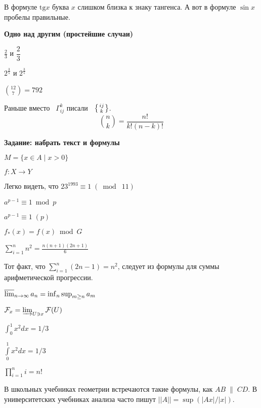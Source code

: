 \documentclass[12pt]{article}
\newcommand{\nl}{\vspace{\baselineskip}} %
\begin{document}
В формуле $\mathrm{tg} x$ буква $x$ слишком близка к знаку тангенса. А вот в формуле $\sin x$ пробелы правильные.

\begin{center}
\textbf{Одно над другим (простейшие случаи)}
\end{center}

$\frac23$ и $\dfrac23$\nl

$2^{\frac35}$ и $2^{\tfrac35}$\nl

$\binom{12}7=792$\nl

Раньше вместо ~$\Gamma^k_{ij}$ писали ~$\left\{ij\atop k\right\}$.
$${n\choose k}=\frac{n!}{k!(n-k)!}$$

\begin{center}
\textbf{Задание: набрать текст и формулы}
\end{center}

$M = \{ x \in A \mid x > 0\}$ \nl

$f: X \rightarrow Y$ \nl

Легко видеть, что $23^{1993} \equiv 1 \; (\bmod\;11)$  \nl

$a^{p-1} \equiv 1 \bmod p$

$a^{p-1} \equiv 1\;(p)$ \nl

$f_*(x) = f(x) \bmod G$ \nl

$\sum\limits_{i = 1}^n n^2 = \frac{n(n+1)(2n+1)}{6}$ \nl

Тот факт, что $\sum_{i = 1}^n (2n - 1) = n^2$, следует из формулы для суммы арифметической прогрессии. \nl

$\varlimsup_{n \to \infty} a_n = \inf_n \sup_{m \geq n} a_m$ \nl

$\mathcal{F}_x = \varinjlim_{U \ni x} \mathcal{F}(U)$ \nl

$\int_0^1 x^2 dx = 1 / 3$ \nl

$\int\limits_0^1 x^2 dx = 1 / 3$ \nl

$\prod_{i=1}^n i = n!$ \nl

В школьных учебниках геометрии встречаются такие формулы, как $AB\;\|\;CD$.
В университетских учебниках анализа часто пишут $||A|| = \sup(|Ax| / |x|)$.
\end{document}
